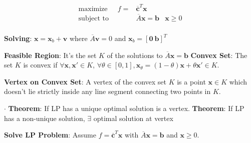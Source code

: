 \documentclass[9pt]{article}
\begin{document}
\begin{multicols}{2}
    \begin{align*}
        \text{maximize} \quad \ \ f = & \overline{\mathbf{c}}^T\mathbf{x} & \\
        \text{subject to} \quad \qquad & \overline{A}\mathbf{x} = \mathbf{b} & \mathbf{x} \geq 0 \\
    \end{align*}
    
    \vspace{-20pt}
    \textbf{Solving}: $\mathbf{x}=\mathbf{x}_b+\mathbf{v}$ where $\overline{A}\mathbf{v}=0$ and $\mathbf{x}_b=[\mathbf{0} \ \mathbf{b}]^T$

\end{multicols}

\vspace{-15pt}
\textbf{Feasible Region}: {\small It's the set $K$ of the solutions to $\overline{A}\mathbf{x}=\mathbf{b}$} \quad \textbf{Convex Set}: {\small The set $K$ is convex if $\forall \mathbf{x},\mathbf{x'}\in K$, $\forall\theta\in[0,1],\mathbf{x}_{\theta}=(1-\theta)\mathbf{x}+\theta\mathbf{x'}\in K$.}

\textbf{Vertex on Convex Set}: {\footnotesize A vertex of the convex set $K$ is a point $\mathbf{x}\in K$ which doesn't lie strictly inside any line segment connecting two points in $K$.}

$\cdot$ \textbf{Theorem}: {\small If LP has a unique optimal solution is a vertex.} \quad \quad \textbf{Theorem}: {\small If LP has a non-unique solution, $\exists$ optimal solution at vertex}

\textbf{Solve LP Problem}: Assume $f=\overline{\mathbf{c}}^T\mathbf{x}$ with $\overline{A}\mathbf{x}=\mathbf{b}$ and $\mathbf{x}\geq0$.
\end{document}
